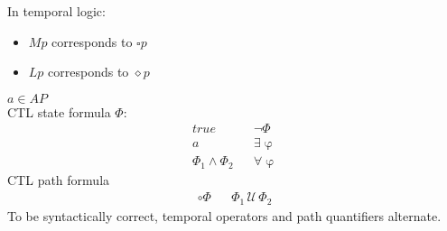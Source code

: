 \documentclass[a4paper, 10pt]{article}
\newcommand{\until}{\,\mathcal{U}\,}
\begin{document}
In temporal logic:
\begin{itemize}
    \item $Mp$ corresponds to $\square p$
    \item $Lp$ corresponds to $\diamond p$
\end{itemize}

\begin{mdframed}[roundcorner=5pt,
subtitlebelowline=false,subtitleaboveline=false,
subtitlebackgroundcolor=blue!30,
frametitlerule=true,
frametitlebackgroundcolor=blue!30,
frametitle={Computation Tree Logic Syntax (CTL Syntax)}
]
$a\in AP$
\\
CTL state formula $\Phi$:
\begin{align*}
true && \neg\Phi \\
a && \exists\upvarphi \\
\Phi_1\wedge\Phi_2 && \forall\upvarphi
\end{align*}
CTL path formula
\begin{align*}
\circ\Phi && \Phi_1\until\Phi_2
\end{align*}
To be syntactically correct, temporal operators and path quantifiers alternate.


\end{mdframed}
\end{document}
